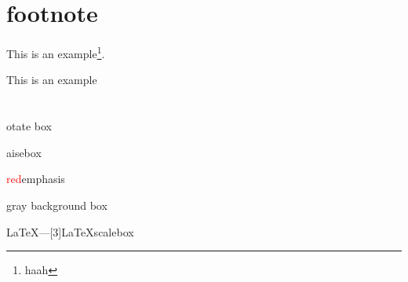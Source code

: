 \documentclass{article}
\begin{document}
\section{footnote}

This is an example\footnote{haah}.

\begin{minipage}{0.2\linewidth}
This is an example \footnotemark
{}
\end{minipage}


\section{}
otate box

aisebox

\textcolor{red}{red}emphasis

\colorbox[gray]{0.85}{gray background box}


\LaTeX---\scalebox{3}[3]{\LaTeX scalebox}



\end{document}

